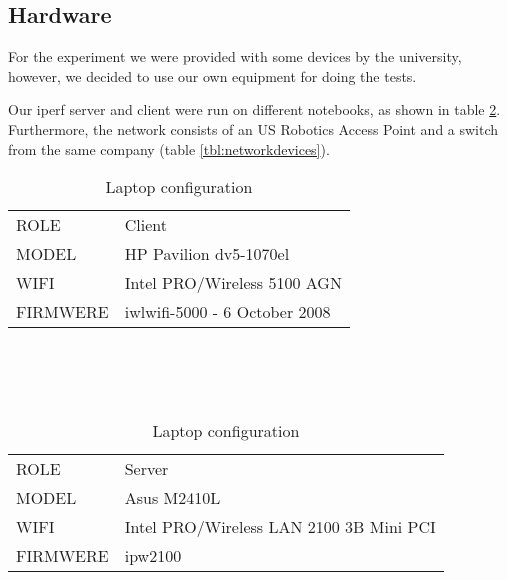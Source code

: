 \subsection{Hardware} \label{setup:hardware}

\noindent
For the experiment we were provided with some devices by the university, however, we decided to use our own equipment for doing the tests.

Our iperf server and client were run on different notebooks, as shown in table \ref{tbl:laptops}. Furthermore, the network consists of an US Robotics Access Point and a switch from the same company (table \ref{tbl:networkdevices}).


	\begin{table}[h]
		
		\begin{tabularx}{15cm}{ | m{4cm} X | }
			\hline
				ROLE & Client\\
				MODEL & HP Pavilion dv5-1070el\\
				WIFI & Intel PRO/Wireless 5100 AGN\\
				FIRMWERE & iwlwifi-5000 - 6 October 2008\\
			\hline
		\end{tabularx}
		\\\\\\
		\begin{tabularx}{15cm}{ | m{4cm} X | }
			\hline
				ROLE & Server\\
				MODEL & Asus M2410L\\
				WIFI & Intel PRO/Wireless LAN 2100 3B Mini PCI\\
				FIRMWERE & ipw2100\\
			\hline
		\end{tabularx}
		
		\caption{Laptop configuration}
		\label{table1}
		\label{tbl:laptops}
	\end{table}

